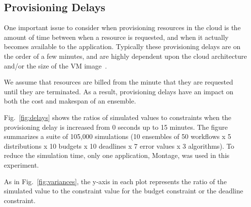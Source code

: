 \documentclass[conference]{IEEEtran}
\begin{document}
\subsection{Provisioning Delays}
\label{sec:delays}

One important issue to consider when provisioning resources in the cloud is
the amount of time between when a resource is requested, and when it actually
becomes available to the application. Typically these provisioning delays are
on the order of a few minutes, and are highly dependent upon the cloud architecture
and/or the size of the VM image~\cite{Nurmi2008b}.

We assume that resources are billed from the minute that they are requested
until they are terminated.  As a result, provisioning delays have an impact on
both the cost and makespan of an ensemble.

Fig.~\ref{fig:delays} shows the ratios of simulated values to constraints when
the provisioning delay is increased from 0 seconds up to 15 minutes. The
figure summarizes a suite of 105,000 simulations (10 ensembles of 50 workflows
x 5 distributions x 10 budgets x 10 deadlines x 7 error values x 3
algorithms). To reduce the simulation time, only one application, Montage, was
used in this experiment. 

As in Fig.~\ref{fig:variances}, the y-axis in each
plot represents the ratio of the simulated value to the constraint value for
the budget constraint or the deadline constraint.
\end{document}
